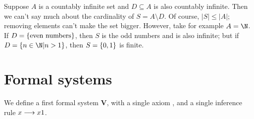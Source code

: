 \documentclass[11pt,letterpaper]{article}
\begin{document}
\begin{rem}
  Suppose $A$ is a countably infinite set and $D \subseteq A$ is also
  countably infinite.
  Then we can't say much about the cardinality of $S = A \setminus D$.
  Of course, $|S| \leq |A|$; removing elements can't make the set bigger.
  However, take for example $A = \N$. If $D = \left\{\text{even numbers}\right\}$,
  then $S$ is the odd numbers and is also infinite;
  but if $D = \setof{n \in \N | n > 1}$,
  then $S = \left\{0, 1\right\}$ is finite.
\end{rem}

\section{Formal systems}

\newcommand{\vsys}{\mathbf{V}}

We define a first formal system $\vsys$, with a single axiom ,
and a single inference rule $x \longrightarrow x1$.
\end{document}
